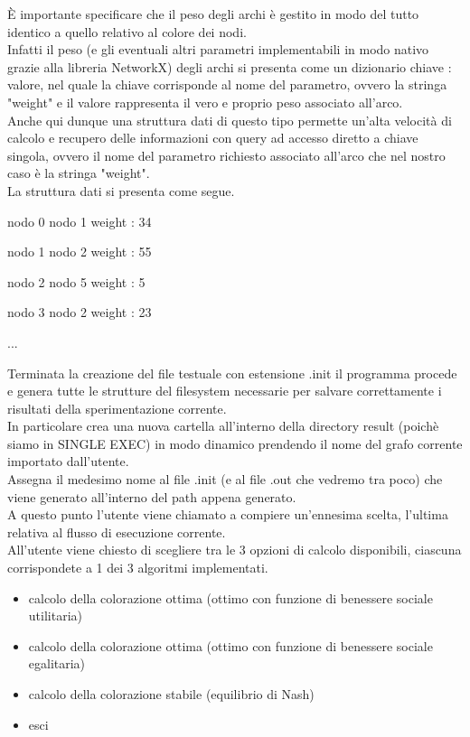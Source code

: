 È importante specificare che il peso degli archi è gestito in modo del tutto identico a quello relativo al colore dei nodi.\\
Infatti il peso (e gli eventuali altri parametri implementabili in modo nativo grazie alla libreria NetworkX) degli archi si presenta come un dizionario chiave : valore, nel quale la chiave corrisponde al nome del parametro, ovvero la stringa "weight" e il valore rappresenta il vero e proprio peso associato all'arco.\\

Anche qui dunque una struttura dati di questo tipo permette un'alta velocità di calcolo e recupero delle informazioni con query ad accesso diretto a chiave singola, ovvero il nome del parametro richiesto associato all'arco che nel nostro caso è la stringa "weight".\\
La struttura dati si presenta come segue.

\begin{description}
	\item nodo 0  nodo 1  weight : 34
	\item nodo 1  nodo 2  weight : 55
	\item nodo 2  nodo 5  weight : 5
	\item nodo 3  nodo 2  weight : 23
	\item ...
\end{description}

Terminata la creazione del file testuale con estensione .init il programma procede e genera tutte le strutture del filesystem necessarie per salvare correttamente i risultati della sperimentazione corrente.\\
In particolare crea una nuova cartella all'interno della directory result (poichè siamo in SINGLE EXEC) in modo dinamico prendendo il nome del grafo corrente importato dall'utente.\\
Assegna il medesimo nome al file .init (e al file .out che vedremo tra poco) che viene generato all'interno del path appena generato.\\

A questo punto l'utente viene chiamato a compiere un'ennesima scelta, l'ultima relativa al flusso di esecuzione corrente.\\
All'utente viene chiesto di scegliere tra le 3 opzioni di calcolo disponibili, ciascuna corrispondete a 1 dei 3 algoritmi implementati.

\begin{itemize}
	\item calcolo della colorazione ottima (ottimo con funzione di benessere sociale utilitaria)
	\item calcolo della colorazione ottima (ottimo con funzione di benessere sociale egalitaria)
	\item calcolo della colorazione stabile (equilibrio di Nash)
	\item esci
\end{itemize}

